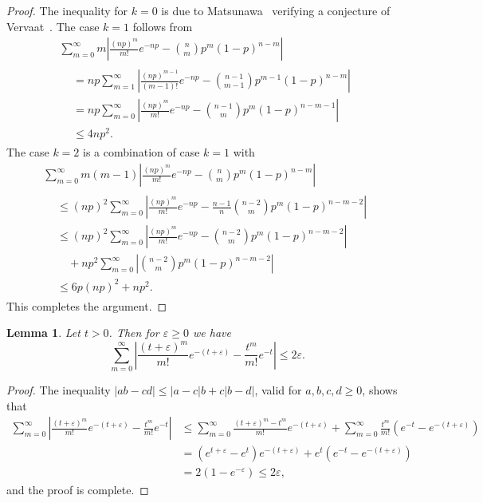\documentclass[10pt]{amsart}
\newtheorem{lemm}[theo]{Lemma}\newtheorem{prop}[theo]{Proposition}\newtheorem{coro}[theo]{Corollary}\newtheorem{conj}[theo]{Conjecture}
\theoremstyle{definition}\newtheorem{defi}[theo]{Definition}\newtheorem{rema}[theo]{Remark}\newtheorem{exam}[theo]{Example}\newtheorem{exem}[theo]{Example}\newtheorem{nota}[theo]{Notation}
\begin{document}
\begin{proof}
The inequality for $k=0$ is due to Matsunawa~\cite{Matsunawa} verifying a conjecture of Vervaat~\cite{Vervaat}. The case $k=1$ follows from
\begin{multline*}
\sum_{m=0}^\infty m \left|\frac{(np)^m}{m!} e^{-np}- \binom{n}{m} p^m (1-p)^{n-m} \right|
\\
\begin{aligned}
&= np\sum_{m=1}^\infty \left|\frac{(np)^{m-1}}{(m-1)!} e^{-np} - \binom{n-1}{m-1} p^{m-1} (1-p)^{n-m} \right|
\\ & = np \sum_{m=0}^\infty \left|\frac{(np)^{m}}{m!} e^{-np} - \binom{n-1}{m} p^{m} (1-p)^{n-m-1} \right|
\\ &\leq 4np^2.
\end{aligned}
\end{multline*}
The case $k=2$ is a combination of case $k=1$ with
\begin{multline*}
\sum_{m=0}^\infty m(m-1) 
\left|\frac{(np)^m}{m!} e^{-np} - \binom{n}{m} p^m (1-p)^{n-m} \right|\\
\begin{aligned}
&\leq  (np)^2 \sum_{m=0}^\infty \left|\frac{(np)^{m}}{m!} e^{-np} - \frac{n-1}{n} \binom{n-2}{m} p^{m} (1-p)^{n-m-2} \right|
\\ &\leq  (np)^2 \sum_{m=0}^\infty \left|\frac{(np)^{m}}{m!} e^{-np} - \binom{n-2}{m} p^{m} (1-p)^{n-m-2} \right|
\\ & \quad+ np^2 \sum_{m=0}^\infty \left| \binom{n-2}{m} p^{m} (1-p)^{n-m-2} \right|
\\ &\leq  6 p (np)^2 + np^2.
\end{aligned}
\end{multline*}
This completes the argument.
\end{proof}


\begin{lemm}\label{le:diff-Poisson-Poisson}
Let $ t > 0 $. Then for $\varepsilon \geq 0$ we have
\begin{equation*}
\sum_{m=0}^\infty \left|\frac{(t+ \varepsilon) ^m}{m!} e^{-(t+ \varepsilon)} - \frac{t^m}{m!} e^{-t} \right| \leq 2 \varepsilon.
\end{equation*}
\end{lemm}


\begin{proof}
The inequality $|ab-cd| \leq |a-c|b + c |b -d| $, valid for $a,b,c,d\geq 0$, shows that
\begin{align*}
\sum_{m=0}^\infty \left|\frac{(t+ \varepsilon)^m}{m!} e^{-(t+ \varepsilon)} - \frac{t^m}{m!} e^{-t} \right| &\leq
\sum_{m=0}^\infty \frac{(t+ \varepsilon)^m-t^m}{m!} e^{- (t+ \varepsilon)} +
\sum_{m=0}^\infty \frac{t^m}{m!} \left(e^{- t} -e^{- (t+ \varepsilon)} \right)
\\ & =
\left(e^{t+ \varepsilon} - e^t \right) e^{- (t+ \varepsilon)} + e^t \left(e^{- t} -e^{- (t+ \varepsilon)} \right)
\\ & = 2(1 - e^{-\varepsilon}) \leq 2 \varepsilon,
\end{align*}
and the proof is complete.
\end{proof}
\end{document}
